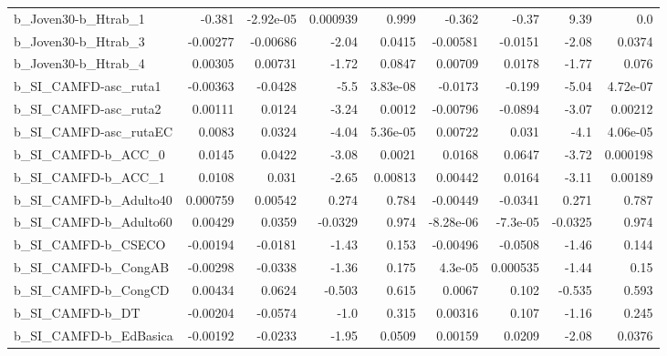 \begin{tabular}{lrrrrrrrr}
b\_Joven30-b\_Htrab\_1        &      -0.381 &    -2.92e-05 & 0.000939 &    0.999 &     -0.362 &       -0.37 &         9.39 &           0.0 \\
b\_Joven30-b\_Htrab\_3        &    -0.00277 &     -0.00686 &    -2.04 &   0.0415 &   -0.00581 &     -0.0151 &        -2.08 &        0.0374 \\
b\_Joven30-b\_Htrab\_4        &     0.00305 &      0.00731 &    -1.72 &   0.0847 &    0.00709 &      0.0178 &        -1.77 &         0.076 \\
b\_SI\_CAMFD-asc\_ruta1       &    -0.00363 &      -0.0428 &     -5.5 & 3.83e-08 &    -0.0173 &      -0.199 &        -5.04 &      4.72e-07 \\
b\_SI\_CAMFD-asc\_ruta2       &     0.00111 &       0.0124 &    -3.24 &   0.0012 &   -0.00796 &     -0.0894 &        -3.07 &       0.00212 \\
b\_SI\_CAMFD-asc\_rutaEC      &      0.0083 &       0.0324 &    -4.04 & 5.36e-05 &    0.00722 &       0.031 &         -4.1 &      4.06e-05 \\
b\_SI\_CAMFD-b\_ACC\_0         &      0.0145 &       0.0422 &    -3.08 &   0.0021 &     0.0168 &      0.0647 &        -3.72 &      0.000198 \\
b\_SI\_CAMFD-b\_ACC\_1         &      0.0108 &        0.031 &    -2.65 &  0.00813 &    0.00442 &      0.0164 &        -3.11 &       0.00189 \\
b\_SI\_CAMFD-b\_Adulto40      &    0.000759 &      0.00542 &    0.274 &    0.784 &   -0.00449 &     -0.0341 &        0.271 &         0.787 \\
b\_SI\_CAMFD-b\_Adulto60      &     0.00429 &       0.0359 &  -0.0329 &    0.974 &  -8.28e-06 &    -7.3e-05 &      -0.0325 &         0.974 \\
b\_SI\_CAMFD-b\_CSECO         &    -0.00194 &      -0.0181 &    -1.43 &    0.153 &   -0.00496 &     -0.0508 &        -1.46 &         0.144 \\
b\_SI\_CAMFD-b\_CongAB        &    -0.00298 &      -0.0338 &    -1.36 &    0.175 &    4.3e-05 &    0.000535 &        -1.44 &          0.15 \\
b\_SI\_CAMFD-b\_CongCD        &     0.00434 &       0.0624 &   -0.503 &    0.615 &     0.0067 &       0.102 &       -0.535 &         0.593 \\
b\_SI\_CAMFD-b\_DT            &    -0.00204 &      -0.0574 &     -1.0 &    0.315 &    0.00316 &       0.107 &        -1.16 &         0.245 \\
b\_SI\_CAMFD-b\_EdBasica      &    -0.00192 &      -0.0233 &    -1.95 &   0.0509 &    0.00159 &      0.0209 &        -2.08 &        0.0376 \\

\end{tabular}
